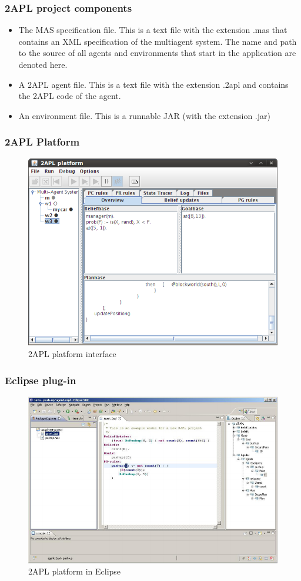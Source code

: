 \documentclass{beamer}
\begin{document}
\begin{frame}
\frametitle{2APL project components}
	\begin{itemize}
	\item  The MAS specification file. This is a text file with the extension .mas that contains an XML specification of the multiagent system. The name and path to the source of all agents and environments that start in the application are denoted here.
    \item A 2APL agent file. This is a text file with the extension .2apl and contains the 2APL code of the agent.
    \item An environment file. This is a runnable JAR (with the extension .jar)
	\end{itemize}
\end{frame}


\begin{frame}
\frametitle{2APL Platform}

    \begin{figure}
	\includegraphics[width=0.75\linewidth]{images/2APLplatform.png}
    \caption{2APL platform interface}
	\end{figure}
  
\end{frame}

\begin{frame}
\frametitle{Eclipse plug-in}
	\begin{figure}
	\includegraphics[width=0.85\linewidth]{images/2APLeclipse.png}
    \caption{2APL platform in Eclipse}
	\end{figure}
\end{frame}
\end{document}
